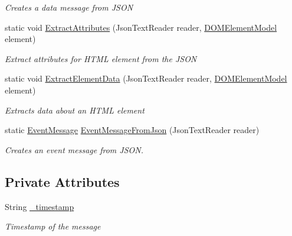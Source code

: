 \begin{DoxyCompactItemize}
\begin{DoxyCompactList}\small\item\em Creates a data message from J\+S\+O\+N \end{DoxyCompactList}\item 
static void \hyperlink{class_web_analyzer_1_1_models_1_1_message_model_1_1_message_a9a2024f67011c88f2d831c4749d8ea06}{Extract\+Attributes} (Json\+Text\+Reader reader, \hyperlink{class_web_analyzer_1_1_models_1_1_data_model_1_1_d_o_m_element_model}{D\+O\+M\+Element\+Model} element)
\begin{DoxyCompactList}\small\item\em Extract attributes for H\+T\+M\+L element from the J\+S\+O\+N \end{DoxyCompactList}\item 
static void \hyperlink{class_web_analyzer_1_1_models_1_1_message_model_1_1_message_a8b1248666d8a8c1819b0920f1960f054}{Extract\+Element\+Data} (Json\+Text\+Reader reader, \hyperlink{class_web_analyzer_1_1_models_1_1_data_model_1_1_d_o_m_element_model}{D\+O\+M\+Element\+Model} element)
\begin{DoxyCompactList}\small\item\em Extracts data about an H\+T\+M\+L element \end{DoxyCompactList}\item 
static \hyperlink{class_web_analyzer_1_1_models_1_1_message_model_1_1_event_message}{Event\+Message} \hyperlink{class_web_analyzer_1_1_models_1_1_message_model_1_1_message_a31e9c8cd83a705cfa9aa12561d2c6ac7}{Event\+Message\+From\+Json} (Json\+Text\+Reader reader)
\begin{DoxyCompactList}\small\item\em Creates an event message from J\+S\+O\+N. \end{DoxyCompactList}\end{DoxyCompactItemize}
\subsection*{Private Attributes}
\begin{DoxyCompactItemize}
\item 
String \hyperlink{class_web_analyzer_1_1_models_1_1_message_model_1_1_message_ae1e243f35e213e08ec2bdc54f64b0d2e}{\+\_\+timestamp}
\begin{DoxyCompactList}\small\item\em Timestamp of the message \end{DoxyCompactList}\end{DoxyCompactItemize}


